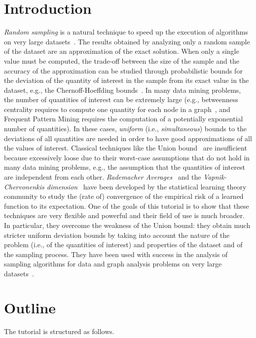 \documentclass{sig-alternate-2013}
\begin{document}
\section{Introduction}\label{introduction}
\emph{Random sampling} is a natural technique to speed up the execution of
algorithms on very large datasets~\citep{CormodeD14}. The results obtained by
analyzing only a random sample of the dataset are an approximation of the exact
solution.  When only a single value must be computed, the trade-off between the
size of the sample and the accuracy of the approximation can be studied through
probabilistic bounds for the deviation of the quantity of interest in
the sample from its exact value in the dataset, e.g., the Chernoff-Hoeffding
bounds~\citep{Hoeffding63}. In many data mining problems, the number of
quantities of interest can be extremely large (e.g., betweenness centrality
requires to compute one quantity for each node in a
graph~\citep{Brandes01,RiondatoK14}, and Frequent Pattern Mining requires the
computation of a potentially exponential number of quantities). In these cases,
\emph{uniform} (i.e., \emph{simultaneous}) bounds to the deviations of all
quantities are needed in order to have good approximations of all the values of
interest. Classical techniques like the Union bound~\citep{MitzenmacherU05} are
insufficient because excessively loose due to their worst-case assumptions that
do not hold in many data mining problems, e.g., the assumption that the
quantities of interest are independent from each other. \emph{Rademacher
Averages}~\citep{BoucheronBL05} and the \emph{Vapnik-Chervonenkis
dimension}~\citep{Vapnik99} have been developed by the statistical learning
theory community to study the (rate of) convergence of the empirical risk of a
learned function to its expectation. One of the goals of this tutorial is to
show that these techniques are very flexible and powerful and their field of use
is much broader. In particular, they overcome the weakness of the Union bound:
they obtain much stricter uniform deviation bounds by taking into account the
nature of the problem (i.e., of the quantities of interest) and properties of
the dataset and of the sampling process. They have been used with success in
the analysis of sampling algorithms for data and graph analysis problems on very
large
datasets~\citep{RiondatoU14,RiondatoU15,RiondatoK14,RiondatoV14,AbrahamDFGW11,KleinbergSS08,BronnimannG95}.

\section{Outline}\label{sec:outline}
The tutorial is structured as follows.
\end{document}
